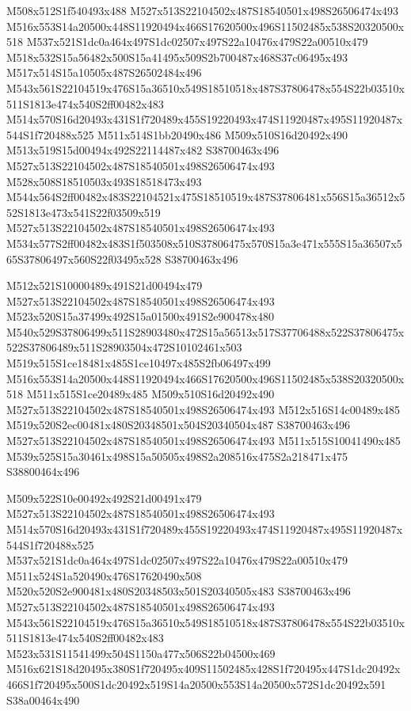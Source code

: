 \documentclass{article}
\begin{document}
\begin{multicols}{2}
M508x512S1f540493x488 M527x513S22104502x487S18540501x498S26506474x493 M516x553S14a20500x448S11920494x466S17620500x496S11502485x538S20320500x518 M537x521S1dc0a464x497S1dc02507x497S22a10476x479S22a00510x479 M518x532S15a56482x500S15a41495x509S2b700487x468S37c06495x493 M517x514S15a10505x487S26502484x496 M543x561S22104519x476S15a36510x549S18510518x487S37806478x554S22b03510x511S1813e474x540S2ff00482x483 M514x570S16d20493x431S1f720489x455S19220493x474S11920487x495S11920487x544S1f720488x525 M511x514S1bb20490x486 M509x510S16d20492x490 M513x519S15d00494x492S22114487x482 S38700463x496 M527x513S22104502x487S18540501x498S26506474x493 M528x508S18510503x493S18518473x493 M544x564S2ff00482x483S22104521x475S18510519x487S37806481x556S15a36512x552S1813e473x541S22f03509x519 M527x513S22104502x487S18540501x498S26506474x493 M534x577S2ff00482x483S1f503508x510S37806475x570S15a3e471x555S15a36507x565S37806497x560S22f03495x528 S38700463x496

M512x521S10000489x491S21d00494x479 M527x513S22104502x487S18540501x498S26506474x493 M523x520S15a37499x492S15a01500x491S2e900478x480 M540x529S37806499x511S28903480x472S15a56513x517S37706488x522S37806475x522S37806489x511S28903504x472S10102461x503 M519x515S1ce18481x485S1ce10497x485S2fb06497x499 M516x553S14a20500x448S11920494x466S17620500x496S11502485x538S20320500x518 M511x515S1ce20489x485 M509x510S16d20492x490 M527x513S22104502x487S18540501x498S26506474x493 M512x516S14c00489x485 M519x520S2ec00481x480S20348501x504S20340504x487 S38700463x496 M527x513S22104502x487S18540501x498S26506474x493 M511x515S10041490x485 M539x525S15a30461x498S15a50505x498S2a208516x475S2a218471x475 S38800464x496

M509x522S10e00492x492S21d00491x479 M527x513S22104502x487S18540501x498S26506474x493 M514x570S16d20493x431S1f720489x455S19220493x474S11920487x495S11920487x544S1f720488x525 M537x521S1dc0a464x497S1dc02507x497S22a10476x479S22a00510x479 M511x524S1a520490x476S17620490x508 M520x520S2e900481x480S20348503x501S20340505x483 S38700463x496 M527x513S22104502x487S18540501x498S26506474x493 M543x561S22104519x476S15a36510x549S18510518x487S37806478x554S22b03510x511S1813e474x540S2ff00482x483 M523x531S11541499x504S1150a477x506S22b04500x469 M516x621S18d20495x380S1f720495x409S11502485x428S1f720495x447S1dc20492x466S1f720495x500S1dc20492x519S14a20500x553S14a20500x572S1dc20492x591 S38a00464x490


\end{multicols}
\end{document}
